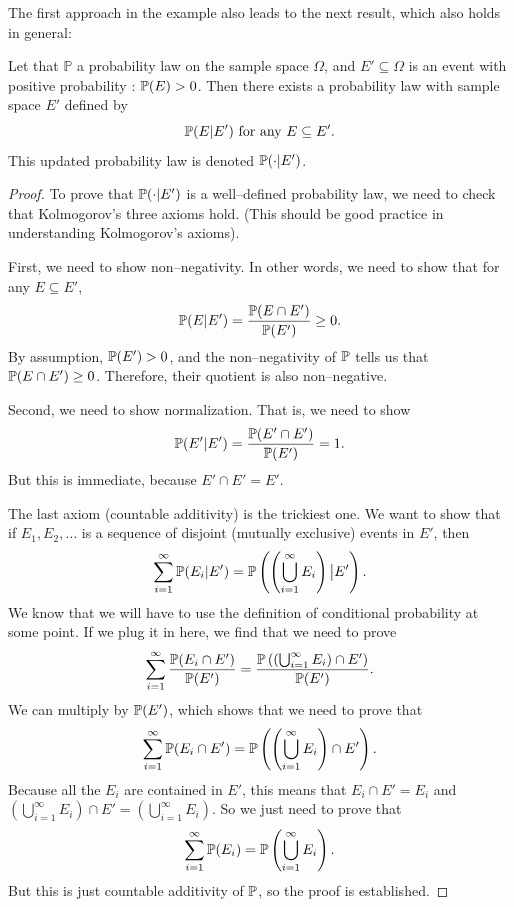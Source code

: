 \documentclass{ximera}
\begin{document}
The first approach in the example also leads to the next result, which also holds in general:

\begin{theorem}
Let that $\mathbb{P}$ a probability law on the sample space $\Omega$, and $E'\subseteq \Omega$ is an event with positive probability : $\mathbb{P}(E)>0$. Then there exists a probability law with sample space $E'$ defined by
$$
\mathbb{P}(E \vert E') \text{ for any } E\subseteq E'.
$$
This updated probability law is denoted $\mathbb{P}(\cdot \vert E')$.
\end{theorem}
\begin{proof}
To prove that $\mathbb{P}(\cdot \vert E')$ is a well--defined probability law, we need to check that Kolmogorov's three axioms hold. (This should be good practice in understanding Kolmogorov's axioms).

First, we need to show non--negativity. In other words, we need to show that for any $E\subseteq E'$,
$$
\mathbb{P}(E \vert E') = \frac{\mathbb{P}(E \cap E') }{\mathbb{P}(E') } \geq 0.
$$
By assumption, $\mathbb{P}(E')>0$, and the non--negativity of $\mathbb{P}$ tells us that $\mathbb{P}(E \cap E')\geq 0$. Therefore, their quotient is also non--negative.

Second, we need to show normalization. That is, we need to show
$$
\mathbb{P}(E' \vert E') = \frac{\mathbb{P}(E' \cap E') }{\mathbb{P}(E') } =1.
$$
But this is immediate, because $E'\cap E'=E'$.

The last axiom (countable additivity) is the trickiest one. We want to show that if $E_1,E_2,\ldots$ is a sequence of disjoint (mutually exclusive) events in $E'$, then
$$
\sum_{i=1}^{\infty} \mathbb{P}(E_i \vert E') = \mathbb{P}\left( \left(\bigcup_{i=1}^{\infty} E_i \right) \big\vert E'\right).
$$
We know that we will have to use the definition of conditional probability at some point. If we plug it in here, we find that we need to prove
$$
\sum_{i=1}^{\infty} \frac{\mathbb{P}(E_i \cap E')}{\mathbb{P}(E')} = \frac{\mathbb{P}\left( \left(\bigcup_{i=1}^{\infty} E_i \right)  \cap E'\right) }{\mathbb{P}(E')}  .
$$
We can multiply by $\mathbb{P}(E')$, which shows that we need to prove that
$$
\sum_{i=1}^{\infty} \mathbb{P}(E_i \cap E') = \mathbb{P}\left( \left(\bigcup_{i=1}^{\infty} E_i \right)  \cap E'\right).
$$
Because all the $E_i$ are contained in $E'$, this means that $E_i \cap E'=E_i$ and $\left(\bigcup_{i=1}^{\infty} E_i \right)  \cap E' = \left(\bigcup_{i=1}^{\infty} E_i \right) $. So we just need to prove that
$$
\sum_{i=1}^{\infty} \mathbb{P}(E_i ) = \mathbb{P} \left(\bigcup_{i=1}^{\infty} E_i  \right).
$$
But this is just countable additivity of $\mathbb{P}$, so the proof is established.
\end{proof}
\end{document}

